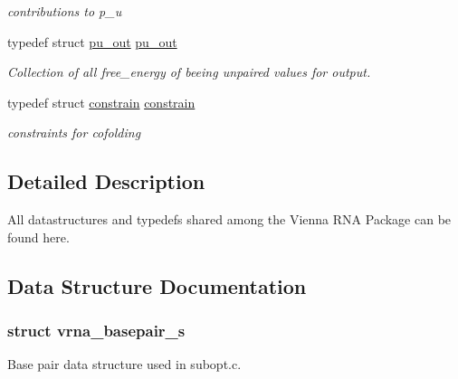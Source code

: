 \begin{DoxyCompactItemize}
\begin{DoxyCompactList}\small\item\em contributions to p\+\_\+u \end{DoxyCompactList}\item 
\hypertarget{group__data__structures_ga501763bd204b60f40e3ab68b40023023}{}typedef struct \hyperlink{group__data__structures_structpu__out}{pu\+\_\+out} \hyperlink{group__data__structures_ga501763bd204b60f40e3ab68b40023023}{pu\+\_\+out}\label{group__data__structures_ga501763bd204b60f40e3ab68b40023023}

\begin{DoxyCompactList}\small\item\em Collection of all free\+\_\+energy of beeing unpaired values for output. \end{DoxyCompactList}\item 
\hypertarget{group__data__structures_ga212e3afb0cc299acdfb1ec976435686e}{}typedef struct \hyperlink{group__data__structures_structconstrain}{constrain} \hyperlink{group__data__structures_ga212e3afb0cc299acdfb1ec976435686e}{constrain}\label{group__data__structures_ga212e3afb0cc299acdfb1ec976435686e}

\begin{DoxyCompactList}\small\item\em constraints for cofolding \end{DoxyCompactList}\end{DoxyCompactItemize}


\subsection{Detailed Description}
All datastructures and typedefs shared among the Vienna R\+N\+A Package can be found here. 



\subsection{Data Structure Documentation}
\label{structvrna__basepair__s}
\hypertarget{group__data__structures_structvrna__basepair__s}{}
\subsubsection{struct vrna\+\_\+basepair\+\_\+s}
Base pair data structure used in subopt.\+c. \label{structvrna__plist__s}
\hypertarget{group__data__structures_structvrna__plist__s}{}
